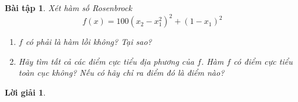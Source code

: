 \documentclass[14pt, a4paper]{article}
\theoremstyle{sltheorem}
\newtheorem{baitap}{Bài tập}
\newtheorem*{loigiai}{Lời giải}
\begin{document}
    \begin{baitap}
        Xét hàm số Rosenbrock
        \begin{equation*}
            f(x)=100(x_2 - x_1^2)^2 + (1-x_1)^2
        \end{equation*}
        \begin{enumerate}[wide, labelwidth=!, labelindent=0pt,label=\textbf{\arabic*}.]
            \item $f$ có phải là hàm lồi không? Tại sao?
            \item Hãy tìm tất cả các điểm cực tiểu địa phương của $f$. Hàm $f$ có điểm cực tiểu toàn cục không? Nếu có hãy chỉ ra điểm đó là điểm nào?
        \end{enumerate}
    \end{baitap}

    \begin{loigiai}

    \end{loigiai}

    \newpage
    \printbibliography[title={TÀI LIỆU THAM KHẢO}]
\end{document}
